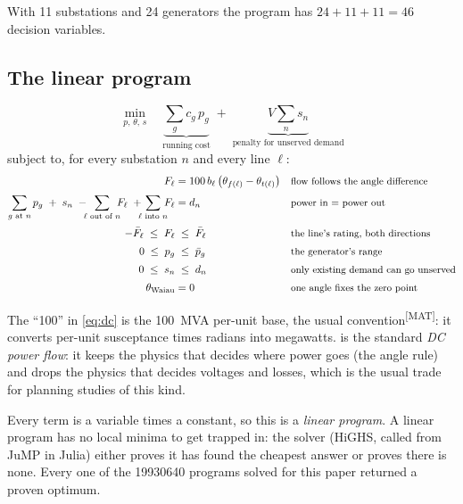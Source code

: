 \documentclass[11pt,a4paper]{article}
\newcommand{\src}[1]{\textsuperscript{[#1]}}
\begin{document}
With 11 substations and 24 generators the program has $24 + 11 + 11 = 46$ decision
variables.

\subsection{The linear program}

\begin{equation}
\min_{p,\,\theta,\,s}\quad
\underbrace{\sum_{g} c_g\, p_g}_{\text{running cost}}
\;+\;
\underbrace{V \sum_{n} s_n}_{\text{penalty for unserved demand}}
\label{eq:obj}
\end{equation}
subject to, for every substation $n$ and every line $\ell$:
\begin{align}
F_\ell &= 100\, b_\ell \left( \theta_{f(\ell)} - \theta_{t(\ell)} \right)
  && \text{\small flow follows the angle difference} \label{eq:dc}\\[2pt]
\sum_{g \text{ at } n} p_g \;+\; s_n
  \;-\!\!\!\sum_{\ell \text{ out of } n}\!\!\! F_\ell
  \;+\!\!\!\sum_{\ell \text{ into } n}\!\!\! F_\ell &= d_n
  && \text{\small power in $=$ power out} \label{eq:bal}\\[2pt]
-\bar F_\ell \;\le\; F_\ell &\;\le\; \bar F_\ell
  && \text{\small the line's rating, both directions} \label{eq:lim}\\[2pt]
0 \;\le\; p_g &\;\le\; \bar p_g
  && \text{\small the generator's range} \label{eq:gen}\\[2pt]
0 \;\le\; s_n &\;\le\; d_n
  && \text{\small only existing demand can go unserved} \label{eq:shed}\\[2pt]
\theta_{\text{Waiau}} &= 0
  && \text{\small one angle fixes the zero point} \label{eq:ref}
\end{align}

The ``100'' in \cref{eq:dc} is the \SI{100}{MVA} per-unit base, the usual
convention\src{MAT}: it converts per-unit susceptance times radians into megawatts.
 is the standard \emph{DC power flow}: it keeps the physics that decides
where power goes (the angle rule) and drops the physics that decides voltages and
losses, which is the usual trade for planning studies of this kind.

Every term is a variable times a constant, so this is a \emph{linear program}. A linear
program has no local minima to get trapped in: the solver (HiGHS, called from JuMP in
Julia) either proves it has found the cheapest answer or proves there is none. Every
one of the \num{19930640} programs solved for this paper returned a proven optimum.
\end{document}
